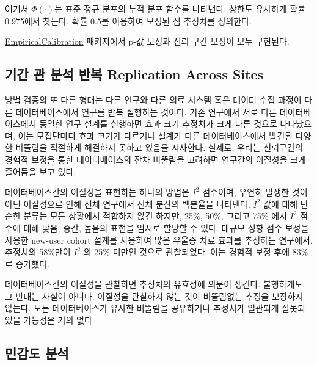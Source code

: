 \documentclass[10.5pt]{book}
\theoremstyle{definition}
\theoremstyle{definition}
\theoremstyle{definition}
\theoremstyle{remark}
\let\BeginKnitrBlock\begin \let\EndKnitrBlock\end
\begin{document}
여기서 \(\Phi(\cdot)\)는 표준 정규 분포의 누적 분포 함수를 나타낸다.
상한도 유사하게 확률 0.975에서 찾는다. 확률 0.5를 이용하여 보정된 점
추정치를 정의한다.

\href{https://ohdsi.github.io/EmpiricalCalibration/}{EmpiricalCalibration}
패키지에서 p-값 보정과 신뢰 구간 보정이 모두 구현된다.

\subsection{기간 관 분석 반복 Replication Across
Sites}\label{----replication-across-sites}


방법 검증의 또 다른 형태는 다른 인구와 다른 의료 시스템 혹은 데이터 수집
과정이 다른 데이터베이스에서 연구를 반복 실행하는 것이다. 기존 연구에서
서로 다른 데이터베이스에서 동일한 연구 설계를 실행하면 효과 크기
추정치가 크게 다른 것으로 나타났으며, \citep{madigan_2013} 이는
모집단마다 효과 크기가 다르거나 설계가 다른 데이터베이스에서 발견된
다양한 비뚤림을 적절하게 해결하지 못하고 있음을 시사한다. 실제로, 우리는
신뢰구간의 경험적 보정을 통한 데이터베이스의 잔차 비뚤림을 고려하면
연구간의 이질성을 크게 줄어듬을 보고 있다. \citep{schuemie_2018}

데이터베이스간의 이질성을 표현하는 하나의 방법은 \(I^2\) 점수이며,
우연히 발생한 것이 아닌 이질성으로 인해 전체 연구에서 전체 분산의
백분율을 나타낸다. \citep{higgins_2003} \(I^2\) 값에 대해 단순한 분류는
모든 상황에서 적합하지 않긴 하지만, 25\%, 50\%, 그리고 75\% 에서 \(I^2\)
점수에 대해 낮음, 중간, 높음의 표현을 임시로 할당할 수 있다. 대규모 성향
점수 보정을 사용한 new-user cohort 설계를 사용하여 많은 우울증 치료
효과를 추정하는 연구에서, \citep{schuemie_2018b} 추정치의 58\%만이
\(I^2\) 의 25\% 미만인 것으로 관찰되었다. 이는 경험적 보정 후에 83\%로
증가했다.

\BeginKnitrBlock{rmdimportant}
데이터베이스간의 이질성을 관찰하면 추정치의 유효성에 의문이 생긴다.
불행하게도, 그 반대는 사실이 아니다. 이질성을 관찰하지 않는 것이
비뚤림없는 추정을 보장하지 않는다. 모든 데이터베이스가 유사한 비뚤림을
공유하거나 추정치가 일관되게 잘못되었을 가능성은 거의 없다.
\EndKnitrBlock{rmdimportant}

\subsection{민감도 분석}\label{-}

\end{document}
